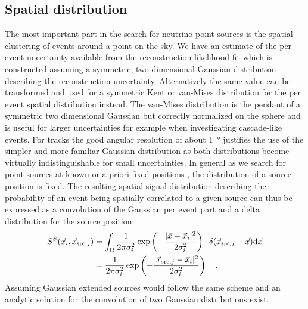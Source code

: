 \subsection{Spatial distribution}
The most important part in the search for neutrino point sources is the spatial clustering of events around a point on the sky.
We have an estimate of the per event uncertainty available from the reconstruction likelihood fit which is constructed assuming a symmetric, two dimensional Gaussian distribution describing the reconstruction uncertainty.
Alternatively the same value can be transformed and used for a symmetric Kent or van-Mises distribution  for the per event spatial distribution instead.
The van-Mises distribution is the pendant of a symmetric two dimensional Gaussian but correctly normalized on the sphere and is useful for larger uncertainties for example when investigating cascade-like events.
For tracks the good angular resolution of about \SI{1}{\degree} justifies the use of the simpler and more familiar Gaussian distribution as both distributions become virtually indistinguishable for small uncertainties.
In general as we search for point sources at known or a-priori fixed positions , the distribution of a source position is fixed.
The resulting spatial signal distribution describing the probability of an event being spatially correlated to a given source can thus be expressed as a convolution of the Gaussian per event part and a delta distribution for the source position:
\begin{equation}
  \begin{aligned}
    S^S(\vec{x}_i, \vec{x}_{\mathrm{src},j}) &=
      \int_\Omega \frac{1}{2\pi \sigma_i^2}
      \exp\left(-\frac{|\vec{x}-\vec{x}_i|^2}{2\sigma_i^2}\right) \cdot
      \delta(\vec{x}_{\mathrm{src},j} - \vec{x}) \mathrm{d}\vec{x} \\
      &= \frac{1}{2\pi \sigma_i^2}
         \exp\left(-\frac{|\vec{x}_{\mathrm{src},j}-
                          \vec{x}_i|^2}{2\sigma_i^2}\right)
      \quad\text{.}
  \end{aligned}
\end{equation}
Assuming Gaussian extended sources would follow the same scheme and an analytic solution for the convolution of two Gaussian distributions exist.


